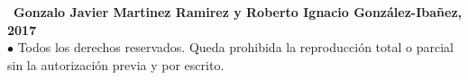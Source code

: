 \thispagestyle{empty}
\null\vfill\par
\begin{flushleft}
	\textcopyright \ \textbf{Gonzalo Javier Martinez Ramirez y Roberto Ignacio González-Ibañez, 2017}\\
	$\bullet$ Todos los derechos reservados. Queda prohibida la reproducción total o parcial sin la autorización 
	previa y por escrito. 
\end{flushleft}
